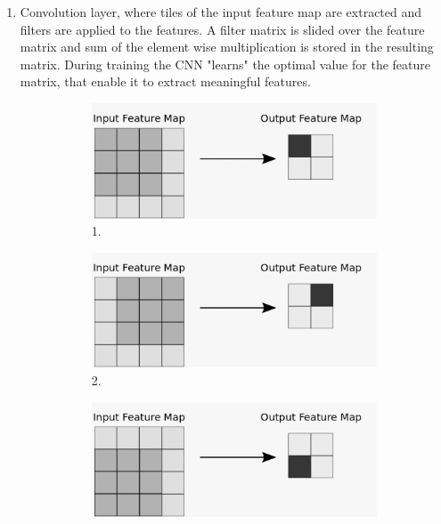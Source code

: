 \documentclass{book}
\begin{document}
\begin{enumerate}
	\item Convolution layer, where tiles of the input feature map are extracted and filters are applied to the features. A filter matrix is slided over the feature matrix and sum of the element wise multiplication is stored in the resulting matrix. During training the CNN "learns" the optimal value for the feature matrix, that enable it to extract meaningful features.
		\begin{figure}[h!]
                  \centering
                  \begin{subfigure}[b]{0.4\linewidth}
                    \includegraphics[width=\linewidth]{Figures/cnn1.jpg}
                    \caption{1.}
                  \end{subfigure}
                  \begin{subfigure}[b]{0.4\linewidth}
                    \includegraphics[width=\linewidth]{Figures/cnn2.jpg}
                    \caption{2.}
                  \end{subfigure}
                  \begin{subfigure}[b]{0.4\linewidth}
                    \includegraphics[width=\linewidth]{Figures/cnn3.jpg}

\end{subfigure}
\end{figure}
\end{enumerate}
\end{document}
